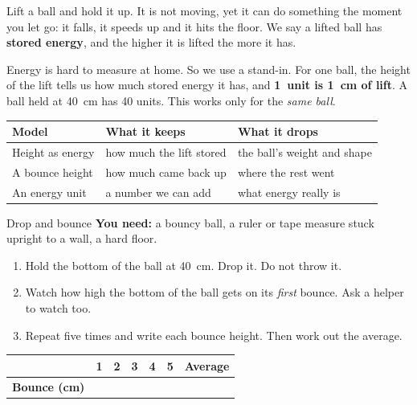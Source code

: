 \label{ch1}

Lift a ball and hold it up. It is not moving, yet it can do something the moment you let go: it falls, it speeds up and it hits the floor. We say a lifted ball has \textbf{stored energy}, and the higher it is lifted the more it has.

Energy is hard to measure at home. So we use a stand-in. For one ball, the height of the lift tells us how much stored energy it has, and \textbf{1~unit is 1~cm of lift}. A ball held at 40~cm has 40 units. This works only for the \emph{same ball}.

\begin{center}
\sffamily\small\renewcommand{\arraystretch}{1.5}
\begin{tabular}{@{}p{3.4cm}p{3.7cm}p{3.7cm}@{}}
\toprule
\textbf{Model} & \textbf{What it keeps} & \textbf{What it drops}\\
\midrule
Height as energy & how much the lift stored & the ball's weight and shape\\
A bounce height & how much came back up & where the rest went\\
An energy unit & a number we can add & what energy really is\\
\bottomrule
\end{tabular}
\end{center}

\begin{tryit}{Drop and bounce}
\textbf{You need:} a bouncy ball, a ruler or tape measure stuck upright to a wall, a hard floor.
\begin{enumerate}[leftmargin=1.6em]
\item Hold the bottom of the ball at 40~cm. Drop it. Do not throw it.
\item Watch how high the bottom of the ball gets on its \emph{first} bounce. Ask a helper to watch too.
\item Repeat five times and write each bounce height. Then work out the average.
\end{enumerate}
\par\medskip
\renewcommand{\arraystretch}{1.6}
\begin{tabular}{|l|c|c|c|c|c|c|}
\hline
 & \textbf{1} & \textbf{2} & \textbf{3} & \textbf{4} & \textbf{5} & \textbf{Average}\\ \hline
\textbf{Bounce (cm)} & & & & & & \\ \hline
\end{tabular}
\end{tryit}

